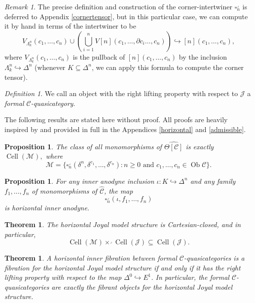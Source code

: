 \documentclass{amsart}
\numberwithin{equation}{section}
\theoremstyle{plain}   %
\newtheorem{thm}[subsection]{Theorem}
\newtheorem{prop}[subsection]{Proposition}
\theoremstyle{remark}
\newtheorem{rem}[subsection]{Remark}
\newtheorem{defn}[subsection]{Definition}
\theoremstyle{plain}
\DeclareMathOperator{\Ob}{Ob}
\newcommand{\psh}[1]{\ensuremath{\widehat{#1}}}
\newcommand{\C}{\ensuremath{\mathcal{C}}}
\newcommand{\cellset}{\ensuremath{\widehat{\Theta[\mathcal{C}]}}}
\begin{document}
\begin{rem}
	The precise definition and construction of the corner-intertwiner \(\square^\lrcorner_n\) is deferred to Appendix \ref{cornertensor}, but in this particular case, we can compute it by hand in terms of the intertwiner to be \[V_{\Lambda^n_k}(c_1,\dots,c_n) \cup \left(\bigcup_{i=1}^n V[n](c_1,\dots,\partial c_i \dots, c_n) \right) \hookrightarrow [n](c_1,\dots,c_n),\] where \(V_{\Lambda^n_k}(c_1,\dots,c_n)\) is the pullback of \([n](c_1,\dots,c_n)\) by the inclusion \(\Lambda^n_k\hookrightarrow \Delta^n\) (whenever \(K\subseteq \Delta^n\), we can apply this formula to compute the corner tensor).
\end{rem}

\begin{defn}
	We call an object with the right lifting property with respect to \(\mathscr{J}\) a \emph{formal \(\C\)-quasicategory}.
\end{defn}

The following results are stated here without proof.  All proofs are heavily inspired by \cite{oury} and provided in full in the Appendices \ref{horizontal} and \ref{admissible}.

\begin{prop}
	The class of all monomorphisms of \(\cellset\) is exactly \(\operatorname{Cell}(\mathscr{M}),\) where \[\mathscr{M}=\{\square_n^\lrcorner(\delta^n,\delta^{c_1},\dots,\delta^{c_n}) : n\geq 0 \text{ and } c_1,\dots,c_n \in \Ob \C\}.\]
\end{prop}

\begin{prop}
	For any inner anodyne inclusion \(\iota:K\hookrightarrow \Delta^n\) and any family \(f_1,\dots,f_n\) of monomorphisms of \(\psh{\C}\), the map \[\square^\lrcorner_n(\iota,f_1,\dots,f_n)\] is horizontal inner anodyne.
\end{prop}

\begin{thm} The horizontal Joyal model structure is Cartesian-closed, and in particular, \[\operatorname{Cell}(\mathscr{M})\times^\lrcorner \operatorname{Cell}(\mathscr{J}) \subseteq \operatorname{Cell}(\mathscr{J}).\]
\end{thm}

\begin{thm}\label{isofibrations}
	A horizontal inner fibration between formal \(\C\)-quasicategories is a fibration for the horizontal Joyal model structure if and only if it has the right lifting property with respect to the map \(\Delta^0\hookrightarrow E^1\).  In particular, the formal \(\C\)-quasicategories are exactly the fibrant objects for the horizontal Joyal model structure.
\end{thm}
\end{document}
